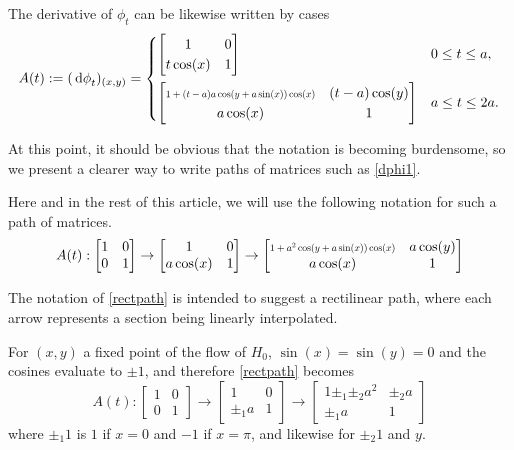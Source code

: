 The derivative of $\phi_t$ can be likewise written by cases
\begin{equation}\label{dphi1}
A(t) := (\dl \phi_t)_{(x,y)} = \begin{cases}
\begin{bmatrix}
1 & 0\\
t \cos(x) & 1
\end{bmatrix} & 0 \leq t \leq a,\\[1.3em]
\begin{bmatrix}
\scalebox{0.7}{$1+(t-a) a \cos(y+a \sin(x)) \cos(x)$} &  (t-a) \cos(y)\\
a \cos(x) & 1
\end{bmatrix}
 & a \leq t \leq 2a.
\end{cases}
\end{equation}

At this point, it should be obvious that the notation is becoming burdensome, so we present a clearer way to write paths of matrices such as \eqref{dphi1}.

Here and in the rest of this article, we will use the following notation for such a path of matrices.
\begin{equation}\label{rectpath}
A(t) :
\begin{bmatrix}
1 & 0\\
0 & 1
\end{bmatrix}
\to
\begin{bmatrix}
1 & 0\\
a \cos(x) & 1
\end{bmatrix}
\to
\begin{bmatrix}
\scalebox{0.7}{$1+ a^2 \cos(y+a \sin(x)) \cos(x)$} &  a \cos(y)\\
a \cos(x) & 1
\end{bmatrix}
\end{equation}

The notation of \eqref{rectpath} is intended to suggest a rectilinear path, where each arrow represents a section being linearly interpolated.

For $(x,y)$ a fixed point of the flow of $H_0$, $\sin(x) = \sin(y) = 0$ and the cosines evaluate to $\pm 1$, and therefore \ref{rectpath} becomes
\begin{equation}\label{rectpath1}
A(t):
\begin{bmatrix}
1 & 0\\
0 & 1
\end{bmatrix}
\to
\begin{bmatrix}
1 & 0\\
\pm_1 a & 1
\end{bmatrix}
\to
\begin{bmatrix}
1 \pm_1 \pm_2 a^2 &  \pm_2 a\\
\pm_1 a & 1
\end{bmatrix}
\end{equation}
where $\pm_1 1$ is $1$ if $x=0$ and $-1$ if $x = \pi$, and likewise for $\pm_2 1$ and $y$.


